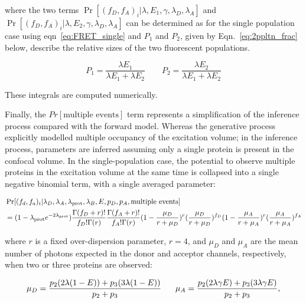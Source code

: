 where the two terms $\Pr[(f_D, f_A)_i | \lambda, E_1, \gamma, \lambda_{D}, \lambda_{A}]$ and $\Pr[(f_D, f_A)_i | \lambda, E_2, \gamma, \lambda_{D}, \lambda_{A}]$ can be determined as for the single population case using eqn~\ref{eq:FRET_single} and $P_1$ and $P_2$, given by Eqn.~\ref{eq:2ppltn_frac} below, describe the relative sizes of the two fluorescent populations.

\begin{equation}
P_1 = \frac{\lambda E_1}{\lambda E_1 + \lambda E_2} \qquad P_2 = \frac{\lambda E_2}{\lambda E_1 + \lambda E_2}
\label{eq:2ppltn_frac}
\end{equation}

These integrals are computed numerically.  

Finally, the $Pr[\text{multiple events}]$ term represents a simplification of the inference process compared with the forward model.  Whereas the generative process explicitly modelled  multiple occupancy of the excitation volume; in the inference process, parameters are inferred assuming only a single protein is present in the confocal volume.  In the single-population case, the potential to observe multiple proteins in the excitation volume at the same time is collapsed into a single negative binomial term, with a single averaged parameter:

\begin{equation}
\begin{aligned}
\footnotesize
&\Pr[(f_d, f_a)_i|\lambda_D, \lambda_A, \lambda_{\text{prot}}, \lambda_B, E, p_D, p_A, \text{multiple events}] \\ 
&= (1-\lambda_{\text{prot}} e^{-2\lambda_{\text{prot}}})\frac{\Gamma(f_D+r)!}{f_D!\Gamma(r)}\frac{\Gamma(f_A+r)!}{f_A!\Gamma(r)}(1-\frac{\mu_D}{r+\mu_D})^r(\frac{\mu_D}{r+\mu_D})^{f_D}(1-\frac{\mu_A}{r+\mu_A})^r(\frac{\mu_A}{r+\mu_A})^{f_A}
\label{eq:multippltn} 
\end{aligned}
\end{equation}

where $r$ is a fixed over-dispersion parameter, $r = 4$, and $\mu_D$ and $\mu_A$ are the mean number of photons expected in the donor and acceptor channels, respectively, when two or three proteins are observed:

\begin{equation}
\footnotesize
\mu_D = \frac{p_2(2\lambda(1-E)) +p_3(3\lambda(1-E))}{p_2+p_3} \qquad
\mu_A = \frac{p_2(2\lambda \gamma E) +p_3(3\lambda \gamma E)}{p_2+p_3} ,
\end{equation}

